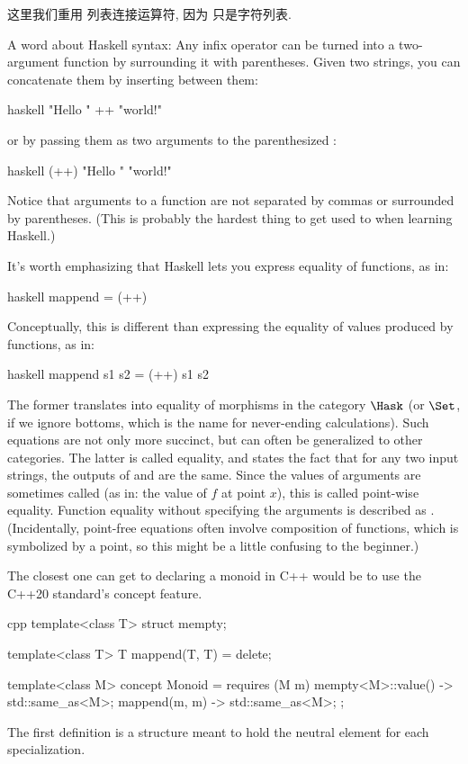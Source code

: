 这里我们重用 \code{(++)} 列表连接运算符, 因为  只是字符列表.

A word about Haskell syntax: Any infix operator can be turned into a
two-argument function by surrounding it with parentheses. Given two
strings, you can concatenate them by inserting \code{++} between them:

\begin{snip}{haskell}
"Hello " ++ "world!"
\end{snip}
or by passing them as two arguments to the parenthesized \code{(++)}:

\begin{snip}{haskell}
(++) "Hello " "world!"
\end{snip}
Notice that arguments to a function are not separated by commas or
surrounded by parentheses. (This is probably the hardest thing to get
used to when learning Haskell.)

It's worth emphasizing that Haskell lets you express equality of
functions, as in:

\begin{snip}{haskell}
mappend = (++)
\end{snip}
Conceptually, this is different than expressing the equality of values
produced by functions, as in:

\begin{snip}{haskell}
mappend s1 s2 = (++) s1 s2
\end{snip}
The former translates into equality of morphisms in the category
$\Hask$ (or $\Set$, if we ignore bottoms, which is the name
for never-ending calculations). Such equations are not only more
succinct, but can often be generalized to other categories. The latter
is called  equality, and states the fact that for any
two input strings, the outputs of  and \code{(++)} are
the same. Since the values of arguments are sometimes called
 (as in: the value of $f$ at point $x$), this is called
point-wise equality. Function equality without specifying the arguments
is described as . (Incidentally, point-free equations
often involve composition of functions, which is symbolized by a point,
so this might be a little confusing to the beginner.)

The closest one can get to declaring a monoid in C++ would be to use the
C++20 standard's concept feature.

\begin{snip}{cpp}
template<class T>
struct mempty;

template<class T>
T mappend(T, T) = delete;

template<class M>
concept Monoid = requires (M m) {
    { mempty<M>::value() } -> std::same_as<M>;
    { mappend(m, m) } -> std::same_as<M>;
};
\end{snip}
The first definition is a structure meant to hold the neutral element for each
specialization.


